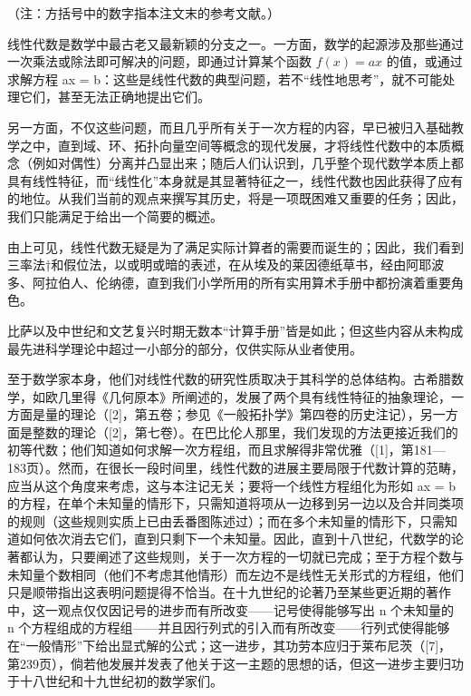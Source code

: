 
（注：方括号中的数字指本注文末的参考文献。）

线性代数是数学中最古老又最新颖的分支之一。一方面，数学的起源涉及那些通过一次乘法或除法即可解决的问题，即通过计算某个函数 \(f(x) = ax\) 的值，或通过求解方程 ax = b：这些是线性代数的典型问题，若不“线性地思考”，就不可能处理它们，甚至无法正确地提出它们。

另一方面，不仅这些问题，而且几乎所有关于一次方程的内容，早已被归入基础教学之中，直到域、环、拓扑向量空间等概念的现代发展，才将线性代数中的本质概念（例如对偶性）分离并凸显出来；随后人们认识到，几乎整个现代数学本质上都具有线性特征，而“线性化”本身就是其显著特征之一，线性代数也因此获得了应有的地位。从我们当前的观点来撰写其历史，将是一项既困难又重要的任务；因此，我们只能满足于给出一个简要的概述。

由上可见，线性代数无疑是为了满足实际计算者的需要而诞生的；因此，我们看到三率法†和假位法，以或明或暗的表述，在从埃及的莱因德纸草书，经由阿耶波多、阿拉伯人、伦纳德，直到我们小学所用的所有实用算术手册中都扮演着重要角色。

比萨以及中世纪和文艺复兴时期无数本“计算手册”皆是如此；但这些内容从未构成最先进科学理论中超过一小部分的部分，仅供实际从业者使用。

至于数学家本身，他们对线性代数的研究性质取决于其科学的总体结构。古希腊数学，如欧几里得《几何原本》所阐述的，发展了两个具有线性特征的抽象理论，一方面是量的理论（{[}2{]}，第五卷；参见《一般拓扑学》第四卷的历史注记），另一方面是整数的理论（{[}2{]}，第七卷）。在巴比伦人那里，我们发现的方法更接近我们的初等代数；他们知道如何求解一次方程组，而且求解得非常优雅（{[}1{]}，第181—183页）。然而，在很长一段时间里，线性代数的进展主要局限于代数计算的范畴，应当从这个角度来考虑，这与本注记无关；要将一个线性方程组化为形如 ax = b 的方程，在单个未知量的情形下，只需知道将项从一边移到另一边以及合并同类项的规则（这些规则实质上已由丢番图陈述过）；而在多个未知量的情形下，只需知道如何依次消去它们，直到只剩下一个未知量。因此，直到十八世纪，代数学的论著都认为，只要阐述了这些规则，关于一次方程的一切就已完成；至于方程个数与未知量个数相同（他们不考虑其他情形）而左边不是线性无关形式的方程组，他们只是顺带指出这表明问题提得不恰当。在十九世纪的论著乃至某些更近期的著作中，这一观点仅仅因记号的进步而有所改变——记号使得能够写出 n 个未知量的 n 个方程组成的方程组——并且因行列式的引入而有所改变——行列式使得能够在“一般情形”下给出显式解的公式；这一进步，其功劳本应归于莱布尼茨（{[}7{]}，第239页），倘若他发展并发表了他关于这一主题的思想的话，但这一进步主要归功于十八世纪和十九世纪初的数学家们。

